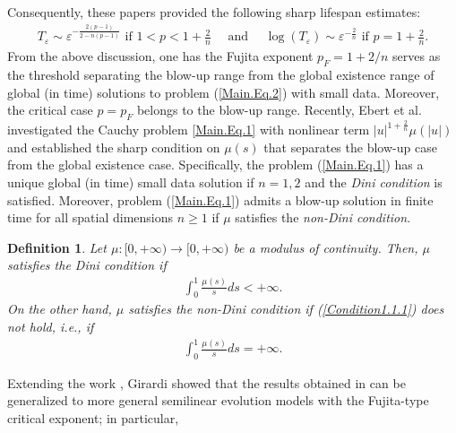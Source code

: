 \documentclass[11pt,reqno]{amsart}
\newtheorem{definition}{Definition}[section]
\begin{document}
Consequently, these papers provided the following sharp lifespan estimates:
\begin{align*}
    T_{\varepsilon} \sim \varepsilon^{-\frac{2(p-1)}{2-n(p-1)}} \text{ if } 1 < p < 1+\displaystyle\frac{2}{n} \quad\text{ and }\quad \log(T_{\varepsilon}) \sim  \varepsilon^{-\frac{2}{n}} \text{ if } p = 1+\displaystyle\frac{2}{n}.
\end{align*}
From the above discussion, one has the Fujita exponent $p_F= 1+2/n$ serves as the threshold separating the blow-up range from the global existence range of global (in time) solutions to problem (\ref{Main.Eq.2}) with small data. Moreover, the critical case $p = p_F$ belongs to the blow-up range. Recently, Ebert et al. \cite{EbeGirRei2020} investigated the Cauchy problem \eqref{Main.Eq.1} with nonlinear term $|u|^{1+\frac{2}{n}} \mu(|u|)$ and established the sharp condition on $\mu(s)$ that separates the blow-up case from the global existence case. Specifically, the problem (\ref{Main.Eq.1}) has a unique global (in time) small data solution if $n=1,2$ and the \textit{Dini condition} is satisfied. Moreover, problem (\ref{Main.Eq.1}) admits a blow-up solution in finite time for all spatial dimensions $n \geq 1$ if $\mu$ satisfies the \textit{non-Dini condition}.
\begin{definition}
    Let $\mu : [0, +\infty) \to [0, +\infty)$ be a modulus of continuity. Then, $\mu$ satisfies the Dini condition if
    \begin{align}
        \int_0^{1} \frac{\mu(s)}{s} ds < +\infty. \label{Condition1.1.1}
    \end{align}
    On the other hand, $\mu$ satisfies the non-Dini condition if (\ref{Condition1.1.1}) does not hold, i.e., if
    \begin{align}
        \int_0^{1} \frac{\mu(s)}{s} ds = +\infty. \label{Condition1.2.1}
    \end{align}
\end{definition}
 Extending the work \cite{EbeGirRei2020}, Girardi \cite{Girardi2024} showed that the results obtained in \cite{EbeGirRei2020} can be generalized to
more general semilinear evolution models with the Fujita-type critical exponent; in particular,
\end{document}
